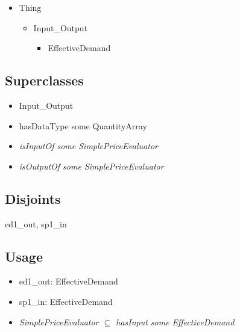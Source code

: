 \documentclass{article}
\begin{document}
\begin{itemize}
\renewcommand{\labelitemi}{$\bullet$}
\renewcommand{\labelitemii}{$\bullet$}
\renewcommand{\labelitemiii}{$\bullet$}
    \item Thing
    \begin{itemize}
    \item Input\_Output
        \begin{itemize}
        \item EffectiveDemand
        \end{itemize}
    \end{itemize}
\end{itemize}

\subsection*{Superclasses}

\begin{itemize}
\item Input\_Output
\item hasDataType some QuantityArray
\item \emph{isInputOf some SimplePriceEvaluator}
\item \emph{isOutputOf some SimplePriceEvaluator}
\end{itemize}

\subsection*{Disjoints}

ed1\_out, sp1\_in

\subsection*{Usage}

\begin{itemize}
\item ed1\_out: EffectiveDemand
\item sp1\_in: EffectiveDemand
\item \emph{SimplePriceEvaluator $\subseteq$ hasInput some EffectiveDemand}
\end{itemize}
\end{document}
